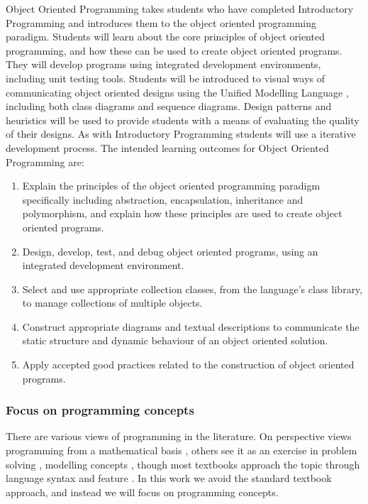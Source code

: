 Object Oriented Programming takes students who have completed Introductory Programming and introduces them to the object oriented programming paradigm. Students will learn about the core principles of object oriented programming, and how these can be used to create object oriented programs. They will develop programs using integrated development environments, including  unit testing tools. Students will be introduced to visual ways of communicating object oriented designs using the Unified Modelling Language \cite{Fowler:2004}, including both class diagrams and sequence diagrams. Design patterns and heuristics will be used to provide students with a means of evaluating the quality of their designs. As with Introductory Programming students will use a iterative development process. The intended learning outcomes for Object Oriented Programming are:
\begin{enumerate}
	\item Explain the principles of the object oriented programming paradigm specifically including abstraction, encapsulation, inheritance and polymorphism, and explain how these principles are used to create object oriented programs.
	\item Design, develop, test, and debug object oriented programs, using an integrated development environment.
	\item Select and use appropriate collection classes, from the language's class library, to manage collections of multiple objects.
	\item Construct appropriate diagrams and textual descriptions to communicate the static structure and dynamic behaviour of an object oriented solution.
	\item Apply accepted good practices related to the construction of object oriented programs.
\end{enumerate}


\subsubsection{Focus on programming concepts} %
\label{sub:focus_on_programming_concepts}

There are various views of programming in the literature. On perspective views programming from a mathematical basis \cite{Denning:1989,Dijkstra:1989,Hoare:1969}, others see it as an exercise in problem solving \cite{Palumbo:1990}, modelling concepts \cite{Bennedsen:2004}, though most textbooks approach the topic through language syntax and feature \cite{Robins:2003}. In this work we avoid the standard textbook approach, and instead we will focus on programming concepts.

